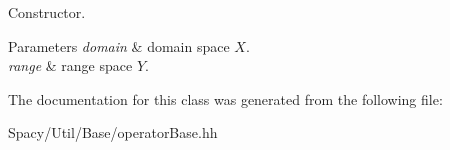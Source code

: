 Constructor. 


\begin{DoxyParams}{Parameters}
{\em domain} & domain space $X$. \\
\hline
{\em range} & range space $Y$. \\
\hline
\end{DoxyParams}


The documentation for this class was generated from the following file\+:\begin{DoxyCompactItemize}
\item 
Spacy/\+Util/\+Base/operator\+Base.\+hh\end{DoxyCompactItemize}
